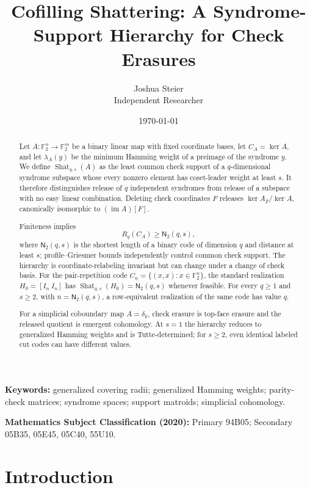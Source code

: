 \documentclass[11pt,letterpaper]{article}
\title{Cofilling Shattering: A Syndrome-Support Hierarchy for Check Erasures}
\author{Joshua Steier\\[-1mm]
\small Independent Researcher\\[-1mm]}
\date{\today}
\theoremstyle{plain}
\theoremstyle{definition}
\newcommand{\F}{\mathbb{F}_2}
\newcommand{\im}{\operatorname{im}}
\newcommand{\Shat}{\operatorname{Shat}}
\newcommand{\1}{\mathbf{1}}
\begin{document}
\pagestyle{myheadings}
\maketitle

\begin{abstract}
Let $A:\F^n\to\F^m$ be a binary linear map with fixed coordinate bases,
let $C_A=\ker A$, and let $\lambda_A(y)$ be the minimum Hamming weight of a
preimage of the syndrome $y$.  We define $\Shat_{q,s}(A)$ as the least common
check support of a $q$-dimensional syndrome subspace whose every nonzero
element has coset-leader weight at least $s$.  It therefore distinguishes
release of $q$ independent syndromes from release of a subspace with no
easy linear combination.  Deleting check coordinates $F$ releases
$\ker A_{\bar F}/\ker A$, canonically isomorphic to $(\im A)[F]$.

Finiteness implies
\[
 R_q(C_A)\ge \mathsf N_2(q,s),
\]
where $\mathsf N_2(q,s)$ is the shortest length of a binary code of dimension
$q$ and distance at least $s$; profile--Griesmer bounds independently control
common check support.  The hierarchy is coordinate-relabeling invariant but
can change under a change of check basis.  For the pair-repetition code
$C_n=\{(x,x):x\in\F^n\}$, the standard realization $H_0=[I_n\ I_n]$ has
$\Shat_{q,s}(H_0)=\mathsf N_2(q,s)$ whenever feasible.  For every $q\ge1$
and $s\ge2$, with $n=\mathsf N_2(q,s)$, a row-equivalent realization of the
same code has value $q$.

For a simplicial coboundary map $A=\delta_k$, check erasure is top-face
erasure and the released quotient is emergent cohomology.  At $s=1$ the
hierarchy reduces to generalized Hamming weights and is Tutte-determined;
for $s\ge2$, even identical labeled cut codes can have different values.
\end{abstract}

\medskip
\noindent\textbf{Keywords:} generalized covering radii; generalized Hamming weights;
parity-check matrices; syndrome spaces; support matroids; simplicial cohomology.

\smallskip
\noindent\textbf{Mathematics Subject Classification (2020):}
Primary 94B05; Secondary 05B35, 05E45, 05C40, 55U10.

\section{Introduction}\label{sec:introduction}
\end{document}
